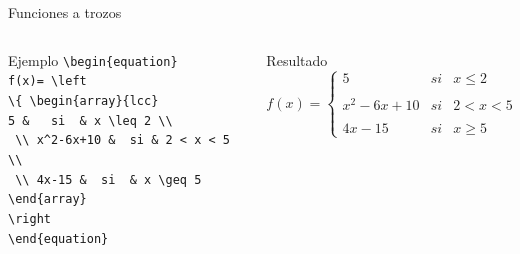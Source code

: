 \documentclass[aspectratio=169, 10pt]{beamer}
\begin{document}
\begin{frame}[fragile]{Funciones a trozos}
    \begin{columns}
        \begin{column}{0.5\linewidth}
        \begin{block}{Ejemplo}
            \verb|\begin{equation}| \\
            \hspace{0.5cm}\verb|f(x)= \left|\\ 
            \hspace{0.5cm}\verb|\{ \begin{array}{lcc}|\\
            \hspace{1cm}\verb|5 &   si  & x \leq 2 \\| \\
            \hspace{1cm}\verb| \\ x^2-6x+10 &  si & 2 < x < 5 \\|\\
            \hspace{1cm}\verb| \\ 4x-15 &  si  & x \geq 5|\\
            \hspace{0.5cm}\verb|\end{array}| \\
            \hspace{0.5cm}\verb|\right|\\
            \verb|\end{equation}|
        \end{block}
        \end{column}
        \begin{column}{0.5\linewidth}
        \begin{exampleblock}{Resultado}
            \begin{equation*}
                f(x)= \left 
                \{ \begin{array}{lcc}
                    5 &   si  & x \leq 2 \\
                    \\ x^2-6x+10 &  si & 2 < x < 5 \\
                    \\ 4x-15 &  si  & x \geq 5
                \end{array}
                \right.
            \end{equation*}
        \end{exampleblock}
        \end{column}
    \end{columns}
\end{frame}
\end{document}
